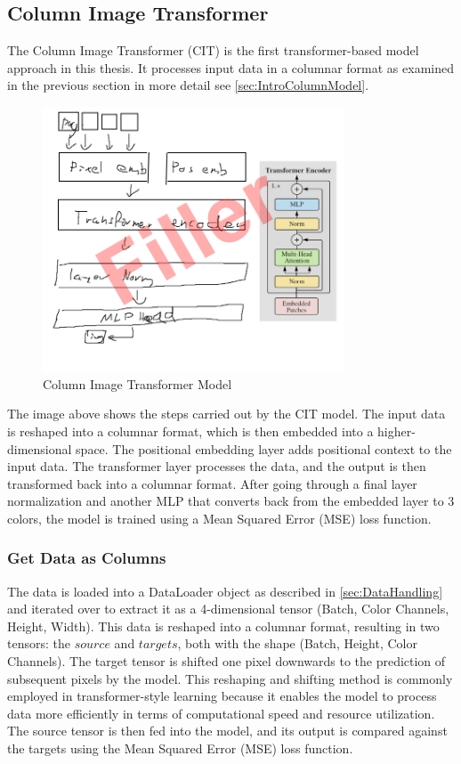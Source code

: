 \subsection{Column Image Transformer}
    
    The Column Image Transformer (CIT) is the first transformer-based model approach in this thesis. It processes input data in a columnar format as examined in the previous section in more detail see \autoref{sec:IntroColumnModel}.


    \begin{figure}[H]
        \centering
        \includegraphics[width=0.8\textwidth]{imgs/CITModel.png}
        \caption{Column Image Transformer Model}
        \label{fig:ColumnImageTransformer}
    \end{figure}

    The image above shows the steps carried out by the CIT model. The input data is reshaped into a columnar format, which is then embedded into a higher-dimensional space. The positional embedding layer adds positional context to the input data. The transformer layer processes the data, and the output is then transformed back into a columnar format. After going through a final layer normalization and another MLP that converts back from the embedded layer to 3 colors, the model is trained using a Mean Squared Error (MSE) loss function.

    
    \subsubsection{Get Data as Columns}

    The data is loaded into a DataLoader object as described in \autoref{sec:DataHandling} and iterated over to extract it as a 4-dimensional tensor (Batch, Color Channels, Height, Width). This data is reshaped into a columnar format, resulting in two tensors: the \(source\) and \(targets\), both with the shape (Batch, Height, Color Channels). The target tensor is shifted one pixel downwards to the prediction of subsequent pixels by the model. This reshaping and shifting method is commonly employed in transformer-style learning because it enables the model to process data more efficiently in terms of computational speed and resource utilization. The source tensor is then fed into the model, and its output is compared against the targets using the Mean Squared Error (MSE) loss function.

